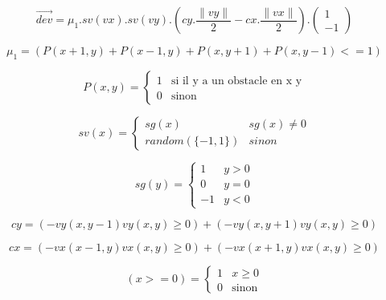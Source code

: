 \documentclass[12pt]{article}
\begin{document}
\[\overrightarrow{dev} = \mu_1.sv(vx).sv(vy).(cy.\frac{\|vy\|}{2}-cx.\frac{\|vx\|}{2}).
\begin{pmatrix}
1 \\
-1
\end{pmatrix}
\]

\[\mu_1 = (P(x+1,y) + P(x-1,y) + P(x,y+1) + P(x,y-1) <= 1) \]

\[ P(x,y) = 
\begin{cases}
	1 & \text{si il y a un obstacle en x y} \\
	0 & \text{sinon}
\end{cases}
\]

\[sv(x) = 
\begin{cases}
	sg(x) & sg(x) \neq 0 \\
	random(\{-1,1\}) & sinon
\end{cases}
\]

\[sg(y) = 
\begin{cases} 
	1 & y > 0 \\
	0 & y = 0 \\
	-1 & y < 0
\end{cases}
\]

\[ cy = 
(-vy(x,y-1)vy(x,y)\ge0)+ 
(-vy(x,y+1)vy(x,y)\ge0)
\]

\[ cx = 
(-vx(x-1,y)vx(x,y)\ge0)+
(-vx(x+1,y)vx(x,y)\ge0)
\]

\[ (x >= 0) = 
\begin{cases}
	1 & x\ge 0 \\
	0 & \text{sinon} 
\end{cases}
\]
\end{document}
